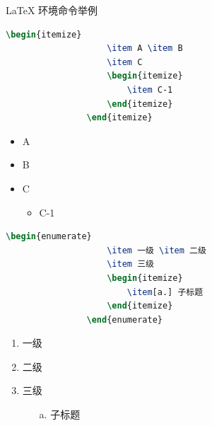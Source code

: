 \documentclass{beamer}
\begin{document}
	\begin{frame}[fragile]{\LaTeX{} 环境命令举例}
		\begin{minipage}{0.5\linewidth}
			\begin{lstlisting}[language=TeX]
				\begin{itemize}
					\item A \item B
					\item C
					\begin{itemize}
						\item C-1
					\end{itemize}
				\end{itemize}
			\end{lstlisting}
		\end{minipage}\hspace{1cm}
		\begin{minipage}{0.3\linewidth}
			\begin{itemize}
				\item A
				\item B
				\item C
				\begin{itemize}
					\item C-1
				\end{itemize}
			\end{itemize}
		\end{minipage}
		\medskip
		\pause
		\begin{minipage}{0.5\linewidth}
			\begin{lstlisting}[language=TeX]
				\begin{enumerate}
					\item 一级 \item 二级
					\item 三级
					\begin{itemize}
						\item[a.] 子标题
					\end{itemize}
				\end{enumerate}
			\end{lstlisting}
		\end{minipage}\hspace{1cm}
		\begin{minipage}{0.3\linewidth}
			\begin{enumerate}
				\item 一级
				\item 二级
				\item 三级
				\begin{itemize}
					\item[a.] 子标题
				\end{itemize}
			\end{enumerate}
		\end{minipage}
	\end{frame}
	
\end{document}
